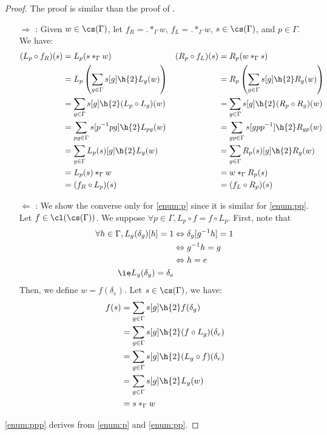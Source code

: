 \begin{proof}
The proof is similar than the proof of .
\begin{itemize}
  \item[$\Rightarrow$]: Given $w \in \cs(\Gamma)$, let $f_R = .\ast_\Gamma w$, $f_L = .\ast_\Gamma w$, $s \in \cs(\Gamma)$, and $p \in \Gamma$. We have:
  \begin{align*}
  (L_p \circ f_R) (s) & = L_p( s \ast_\Gamma w )                                         & (R_p \circ f_L) (s) & = R_p( w \ast_\Gamma s )\\
                & = L_p\left(\displaystyle \sum_{g \in \Gamma} s[g] \h{2} L_g(w)\right)       & & = R_p\left(\displaystyle \sum_{g \in \Gamma} s[g] \h{2} R_g(w)\right)\\
                & = \displaystyle \sum_{g \in \Gamma} s[g] \h{2} (L_p \circ L_g)(w)           & & = \displaystyle \sum_{g \in \Gamma} s[g] \h{2} (R_p \circ R_g)(w)\\
                & = \displaystyle \sum_{pg \in \Gamma} s[p^{-1}pg] \h{2} L_{pg}(w)            & & = \displaystyle \sum_{gp \in \Gamma} s[gpp^{-1}] \h{2} R_{gp}(w)\\          
                & = \displaystyle \sum_{g \in \Gamma} L_p(s)[g] \h{2} L_g(w)                  & & = \displaystyle \sum_{g \in \Gamma} R_p(s)[g] \h{2} R_g(w)\\
                & = L_p(s) \ast_\Gamma w                                                      & & = w \ast_\Gamma R_p(s)\\
                & = (f_R \circ L_p) (s)                                                         & & = (f_L \circ R_p) (s)
  \end{align*}
  \item[$\Leftarrow$]: We show the converse only for \ref{enum:p} since it is similar for  \ref{enum:pp}.
  Let $f \in \cl(\cs(\Gamma))$. We suppose $\forall p \in \Gamma, L_p \circ f = f \circ L_p$. First, note that
  \begin{align*}
  \forall h \in \Gamma, L_g(\delta_g)[h] = 1 & \Leftrightarrow \delta_g[g^{-1}h] = 1\\
  & \Leftrightarrow g^{-1}h = g\\
  & \Leftrightarrow h = e\\
  \ie L_g(\delta_g) = \delta_e
  \end{align*}
  Then, we define $w = f(\delta_e)$. Let $s \in \cs(\Gamma)$, we have:
  \begin{align*}
  f(s) & = \sum_{g \in \Gamma} s[g] \h{2} f(\delta_g)\\
       & = \sum_{g \in \Gamma} s[g] \h{2} (f \circ L_g) (\delta_e)\\
       & = \sum_{g \in \Gamma} s[g] \h{2} (L_g \circ f) (\delta_e)\\
       & = \sum_{g \in \Gamma} s[g] \h{2} L_g(w)\\
       & = s \ast_\Gamma w
  \end{align*}
\end{itemize}
\ref{enum:ppp} derives from \ref{enum:p} and \ref{enum:pp}.
\end{proof}

